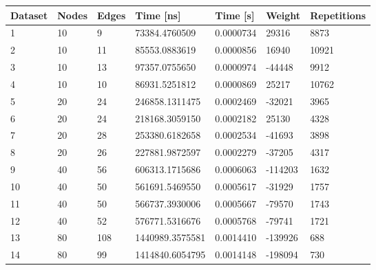 \begin{longtable}{lllllll}
    \textbf{Dataset} & \textbf{Nodes} & \textbf{Edges} & \textbf{Time [ns]}  & \textbf{Time [s]} & \textbf{Weight} & \textbf{Repetitions} \\
    \endhead
    1                & 10             & 9              & 73384.4760509      & 0.0000734        & 29316           & 8873                 \\
    2                & 10             & 11             & 85553.0883619      & 0.0000856        & 16940           & 10921                \\
    3                & 10             & 13             & 97357.0755650      & 0.0000974        & -44448          & 9912                 \\
    4                & 10             & 10             & 86931.5251812      & 0.0000869        & 25217           & 10762                \\
    5                & 20             & 24             & 246858.1311475     & 0.0002469        & -32021          & 3965                 \\
    6                & 20             & 24             & 218168.3059150     & 0.0002182        & 25130           & 4328                 \\
    7                & 20             & 28             & 253380.6182658     & 0.0002534        & -41693          & 3898                 \\
    8                & 20             & 26             & 227881.9872597     & 0.0002279        & -37205          & 4317                 \\
    9                & 40             & 56             & 606313.1715686     & 0.0006063        & -114203         & 1632                 \\
    10               & 40             & 50             & 561691.5469550     & 0.0005617        & -31929          & 1757                 \\
    11               & 40             & 50             & 566737.3930006     & 0.0005667        & -79570          & 1743                 \\
    12               & 40             & 52             & 576771.5316676     & 0.0005768        & -79741          & 1721                 \\
    13               & 80             & 108            & 1440989.3575581    & 0.0014410        & -139926         & 688                  \\
    14               & 80             & 99             & 1414840.6054795    & 0.0014148        & -198094         & 730                  \\

\end{longtable}
